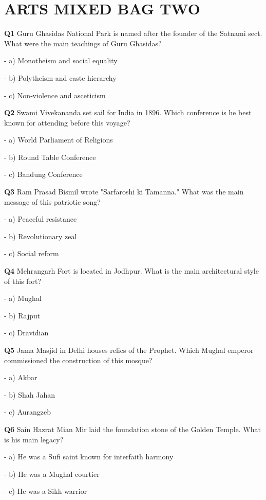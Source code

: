 \section{ARTS MIXED BAG TWO}

\textbf{Q1} Guru Ghasidas National Park is named after the founder of the Satnami sect. What were the main teachings of Guru Ghasidas?\par
\quad - a) Monotheism and social equality\par
\quad - b) Polytheism and caste hierarchy\par
\quad - c) Non‑violence and asceticism\par

\textbf{Q2} Swami Vivekananda set sail for India in 1896. Which conference is he best known for attending before this voyage?\par
\quad - a) World Parliament of Religions\par
\quad - b) Round Table Conference\par
\quad - c) Bandung Conference\par

\textbf{Q3} Ram Prasad Bismil wrote "Sarfaroshi ki Tamanna." What was the main message of this patriotic song?\par
\quad - a) Peaceful resistance\par
\quad - b) Revolutionary zeal\par
\quad - c) Social reform\par

\textbf{Q4} Mehrangarh Fort is located in Jodhpur. What is the main architectural style of this fort?\par
\quad - a) Mughal\par
\quad - b) Rajput\par
\quad - c) Dravidian\par

\textbf{Q5} Jama Masjid in Delhi houses relics of the Prophet. Which Mughal emperor commissioned the construction of this mosque?\par
\quad - a) Akbar\par
\quad - b) Shah Jahan\par
\quad - c) Aurangzeb\par

\textbf{Q6} Sain Hazrat Mian Mir laid the foundation stone of the Golden Temple. What is his main legacy?\par
\quad - a) He was a Sufi saint known for interfaith harmony\par
\quad - b) He was a Mughal courtier\par
\quad - c) He was a Sikh warrior\par

